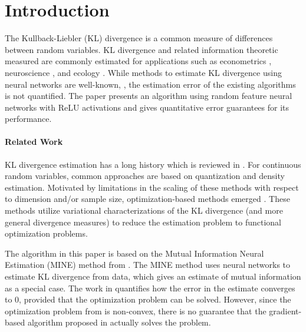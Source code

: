 \documentclass[twoside]{article}
\theoremstyle{definition}
\newcommand{\1}[1]{\scalebox{1.25}{$\mathds{1}$}\left[#1\right]}
\begin{document}
\section{Introduction}

The Kullback-Liebler (KL) divergence is a common measure of differences between random variables. KL divergence and related information theoretic measured are commonly estimated for applications such as econometrics \cite{golan2008information}, neuroscience \cite{timme2018tutorial}, and ecology \cite{ulanowicz2001information}. While methods to estimate KL divergence using neural networks are well-known, \cite{belghazi2018mutual,nowozin2016f}, the estimation error of the existing algorithms is not quantified. The paper presents an algorithm using random feature neural networks with ReLU activations and gives quantitative error guarantees for its performance. 


\paragraph*{Related Work}

KL divergence estimation has a long history which is reviewed in \cite{verdu2019empirical}. For continuous random variables, common approaches are based on quantization and density  estimation. 
Motivated by limitations in the scaling of these methods with respect to dimension and/or sample size, optimization-based methods emerged \cite{nguyen2010estimating,nowozin2016f,belghazi2018mutual,song2020Understanding}. These methods utilize variational characterizations of the KL divergence (and more general divergence measures) to reduce the estimation problem to functional optimization problems. 

The algorithm in this paper is based on the Mutual Information Neural Estimation (MINE) method from \cite{belghazi2018mutual}. The MINE method uses neural networks to estimate KL divergence from data, which gives an estimate of mutual information as a special case.
The work in \cite{belghazi2018mutual,sreekumar2022neural} quantifies how the error in the estimate converges to $0$, provided that the optimization problem can be solved. 
%
However, since the optimization problem from \cite{belghazi2018mutual} is non-convex, there is no guarantee that the gradient-based algorithm proposed in \cite{belghazi2018mutual} actually solves the problem.  
\end{document}
